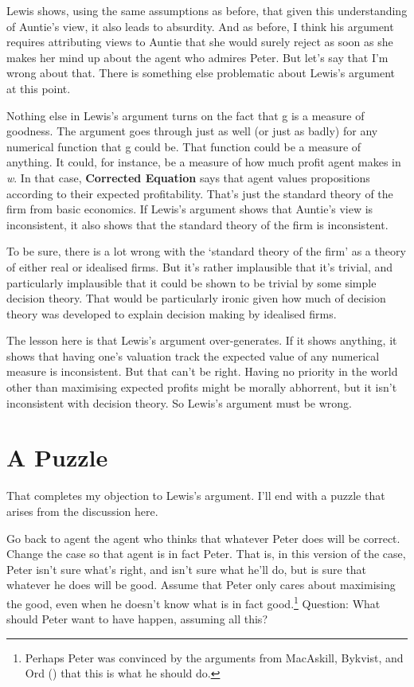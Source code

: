 \documentclass[
  10pt,
  letterpaper,
  DIV=11,
  numbers=noendperiod,
  twoside]{scrartcl}
\begin{document}
Lewis shows, using the same assumptions as before, that given this
understanding of Auntie's view, it also leads to absurdity. And as
before, I think his argument requires attributing views to Auntie that
she would surely reject as soon as she makes her mind up about the agent
who admires Peter. But let's say that I'm wrong about that. There is
something else problematic about Lewis's argument at this point.

Nothing else in Lewis's argument turns on the fact that g is a measure
of goodness. The argument goes through just as well (or just as badly)
for any numerical function that g could be. That function could be a
measure of anything. It could, for instance, be a measure of how much
profit agent makes in \emph{w}. In that case, \textbf{Corrected
Equation} says that agent values propositions according to their
expected profitability. That's just the standard theory of the firm from
basic economics. If Lewis's argument shows that Auntie's view is
inconsistent, it also shows that the standard theory of the firm is
inconsistent.

To be sure, there is a lot wrong with the `standard theory of the firm'
as a theory of either real or idealised firms. But it's rather
implausible that it's trivial, and particularly implausible that it
could be shown to be trivial by some simple decision theory. That would
be particularly ironic given how much of decision theory was developed
to explain decision making by idealised firms.

The lesson here is that Lewis's argument over-generates. If it shows
anything, it shows that having one's valuation track the expected value
of any numerical measure is inconsistent. But that can't be right.
Having no priority in the world other than maximising expected profits
might be morally abhorrent, but it isn't inconsistent with decision
theory. So Lewis's argument must be wrong.

\section{A Puzzle}\label{a-puzzle}

That completes my objection to Lewis's argument. I'll end with a puzzle
that arises from the discussion here.

Go back to agent the agent who thinks that whatever Peter does will be
correct. Change the case so that agent is in fact Peter. That is, in
this version of the case, Peter isn't sure what's right, and isn't sure
what he'll do, but is sure that whatever he does will be good. Assume
that Peter only cares about maximising the good, even when he doesn't
know what is in fact good.\footnote{Perhaps Peter was convinced by the
  arguments from MacAskill, Bykvist, and Ord
  () that this is what he should
  do.} Question: What should Peter want to have happen, assuming all
this?
\end{document}
